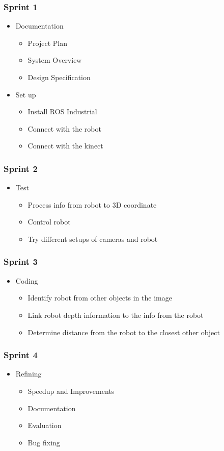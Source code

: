 \documentclass[10pt,a4paper]{article}
\begin{document}
\subsubsection*{Sprint 1}
\begin{itemize}
  \item Documentation
	\begin{itemize}
	\item Project Plan
	\item System Overview
	\item Design Specification
	\end{itemize}
	\item Set up
	\begin{itemize}
	\item Install ROS Industrial
	\item Connect with the robot
	\item Connect with the kinect
	\end{itemize}
\end{itemize}
\subsubsection*{Sprint 2}
\begin{itemize}
\item Test
\begin{itemize}
\item Process info from robot to 3D coordinate
\item Control robot
\item Try different setups of cameras and robot
\end{itemize}
\end{itemize}
\subsubsection*{Sprint 3}
\begin{itemize}
\item Coding
\begin{itemize}
\item Identify robot from other objects in the image
\item Link robot depth information to the info from the robot
\item Determine distance from the robot to the closest other object
\end{itemize}
\end{itemize}
\subsubsection*{Sprint 4}
\begin{itemize}
\item Refining
\begin{itemize}
\item Speedup and Improvements
\item Documentation
\item Evaluation
\item Bug fixing
\end{itemize}
\end{itemize}
\end{document}
